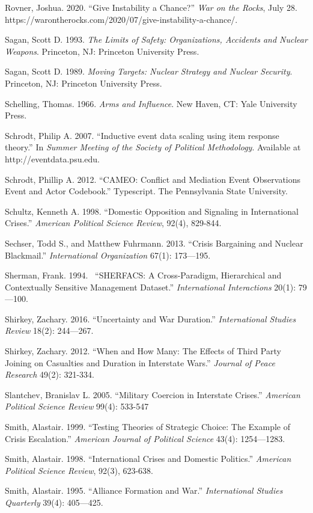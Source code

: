 \documentclass[
]{article}
\begin{document}
Rovner, Joshua. 2020. ``Give Instability a Chance?'' \emph{War on the
Rocks}, July 28.
https://warontherocks.com/2020/07/give-instability-a-chance/.

Sagan, Scott D. 1993. \emph{The Limits of Safety: Organizations,
Accidents and Nuclear Weapons}. Princeton, NJ: Princeton University
Press.

Sagan, Scott D. 1989. \emph{Moving Targets: Nuclear Strategy and Nuclear
Security}. Princeton, NJ: Princeton University Press.

Schelling, Thomas. 1966. \emph{Arms and Influence}. New Haven, CT: Yale
University Press.

Schrodt, Philip A. 2007. ``Inductive event data scaling using item
response theory.'' In \emph{Summer Meeting of the Society of Political
Methodology}. Available at http://eventdata.psu.edu.

Schrodt, Phillip A. 2012. ``CAMEO: Conflict and Mediation Event
Observations Event and Actor Codebook.'' Typescript. The Pennsylvania
State University.

Schultz, Kenneth A. 1998. ``Domestic Opposition and Signaling in
International Crises.'' \emph{American Political Science Review}, 92(4),
829-844.

Sechser, Todd S., and Matthew Fuhrmann. 2013. ``Crisis Bargaining and
Nuclear Blackmail.'' \emph{International Organization} 67(1):
173---195.~

Sherman, Frank. 1994.~ ``SHERFACS: A Cross-Paradigm, Hierarchical and
Contextually Sensitive Management Dataset.'' \emph{International
Interactions} 20(1): 79---100.

Shirkey, Zachary. 2016. ``Uncertainty and War Duration.''
\emph{International Studies Review} 18(2): 244---267.

Shirkey, Zachary. 2012. ``When and How Many: The Effects of Third Party
Joining on Casualties and Duration in Interstate Wars.'' \emph{Journal
of Peace Research} 49(2): 321-334.~

Slantchev, Branislav L. 2005. ``Military Coercion in Interstate
Crises.'' \emph{American Political Science Review} 99(4): 533-547

Smith, Alastair. 1999. ``Testing Theories of Strategic Choice: The
Example of Crisis Escalation.'' \emph{American Journal of Political
Science} 43(4): 1254---1283.~

Smith, Alastair. 1998. ``International Crises and Domestic Politics.''
\emph{American Political Science Review}, 92(3), 623-638.

Smith, Alastair. 1995. ``Alliance Formation and War.''
\emph{International Studies Quarterly} 39(4): 405---425.
\end{document}
